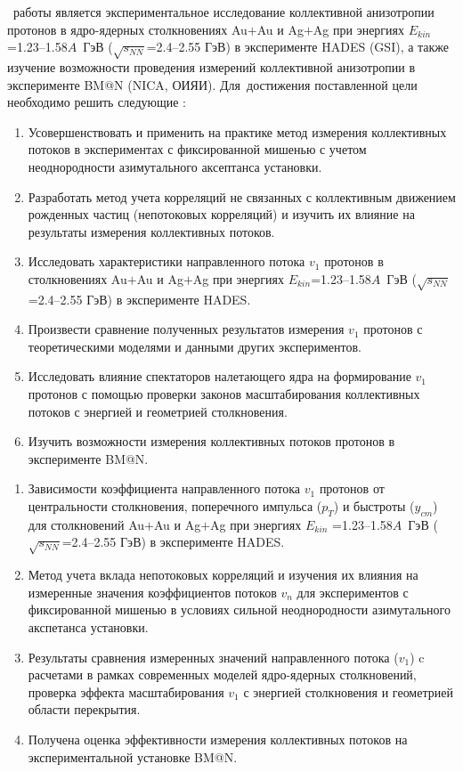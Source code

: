 \aim\ работы является экспериментальное исследование коллективной анизотропии протонов в ядро-ядерных столкновениях  Au$+$Au и Ag$+$Ag при энергиях $E_{kin}$=1.23--1.58$A$~ГэВ ($\sqrt{s_{NN}}$=2.4--2.55 ГэВ) в эксперименте HADES (GSI), а также  изучение возможности проведения измерений коллективной анизотропии в эксперименте BM@N (NICA, ОИЯИ).
Для~достижения поставленной цели необходимо решить следующие {\tasks}:
\begin{enumerate}
    \item  Усовершенствовать  и применить на практике  метод измерения коллективных потоков в экспериментах с фиксированной мишенью с учетом неоднородности азимутального аксептанса установки.

    \item  Разработать метод учета корреляций не связанных с коллективным движением рожденных частиц (непотоковых корреляций) и изучить их влияние на результаты измерения коллективных потоков.

    \item  Исследовать характеристики  направленного потока $v_1$ протонов в столкновениях Au$+$Au и Ag$+$Ag при энергиях $E_{kin}$=1.23--1.58$A$~ГэВ ($\sqrt{s_{NN}}$=2.4--2.55 ГэВ) в эксперименте HADES.

    \item  Произвести  сравнение полученных результатов измерения $v_1$ протонов с теоретическими моделями и данными  других экспериментов.

    \item  Исследовать влияние спектаторов налетающего ядра на формирование $v_1$ протонов с помощью проверки законов масштабирования коллективных потоков с энергией и геометрией столкновения.

    \item  Изучить возможности измерения  коллективных потоков протонов в эксперименте BM@N.
\end{enumerate}
\begin{enumerate}
    \item Зависимости коэффициента направленного потока $v_1$  протонов от центральности столкновения, поперечного импульса ($p_T$) и быстроты  ($y_{cm}$) для 
    столкновений Au$+$Au и Ag$+$Ag при энергиях $E_{kin}$ =1.23--1.58$A$~ГэВ ($\sqrt{s_{NN}}$=2.4--2.55 ГэВ) в эксперименте HADES.
    
    \item Метод учета вклада непотоковых корреляций и изучения их влияния на измеренные значения  коэффициентов потоков $v_n$ для экспериментов с фиксированной мишенью в условиях сильной неоднородности азимутального акспетанса установки.

    \item Результаты сравнения измеренных значений направленного потока ($v_1$) c расчетами в рамках современных моделей ядро-ядерных столкновений, проверка эффекта масштабирования  $v_1$ с энергией столкновения и геометрией области перекрытия.

    \item Получена оценка эффективности измерения коллективных потоков на экспериментальной установке BM@N.
\end{enumerate}
